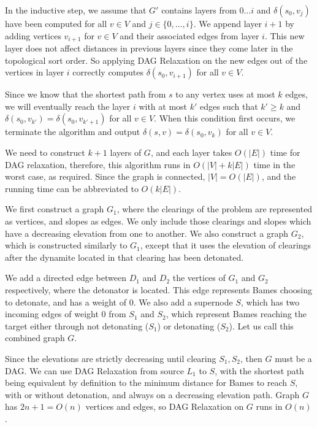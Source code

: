 \documentclass[12pt,twoside]{article}
\begin{document}
\begin{problems}
In the inductive step, we assume that $G'$ contains layers from $0 \ldots i$ and $\delta(s_0,v_j)$ have been computed for all $v \in V$ and $j \in \{0,\ldots,i\}$. We append layer $i+1$ by adding vertices $v_{i+1}$ for $v \in V$ and their associated edges from layer $i$. This new layer does not affect distances in previous layers since they come later in the topological sort order. So applying DAG Relaxation on the new edges out of the vertices in layer $i$ correctly computes $\delta(s_0,v_{i+1})$ for all $v \in V$.

Since we know that the shortest path from $s$ to any vertex uses at most $k$ edges, we will eventually reach the layer $i$ with at most $k'$ edges such that $k' \geq k$ and $\delta(s_0,v_{k'})=\delta(s_0,v_{k'+1})$ for all $v \in V$. When this condition first occurs, we terminate the algorithm and output $\delta(s,v)=\delta(s_0,v_k)$ for all $v \in V$.

We need to construct $k+1$ layers of $G$, and each layer takes $O(|E|)$ time for DAG relaxation, therefore, this algorithm runs in $O(|V|+k|E|)$ time in the worst case, as required. Since the graph is connected, $|V|=O(|E|)$, and the running time can be abbreviated to $O(k|E|)$.

\newpage
\problem  %
We first construct a graph $G_1$, where the clearings of the problem are represented as vertices, and slopes as edges. We only include those clearings and slopes which have a decreasing elevation from one to another. We also construct a graph $G_2$, which is constructed similarly to $G_1$, except that it uses the elevation of clearings after the dynamite located in that clearing has been detonated.

We add a directed edge between $D_1$ and $D_2$ the vertices of $G_1$ and $G_2$ respectively, where the detonator is located. This edge represents Bames choosing to detonate, and has a weight of 0. We also add a supernode $S$, which has two incoming edges of weight 0 from $S_1$ and $S_2$, which represent Bames reaching the target either through not detonating ($S_1$) or detonating ($S_2$). Let us call this combined graph $G$.

Since the elevations are strictly decreasing until clearing $S_1,S_2$, then $G$ must be a DAG. We can use DAG Relaxation from source $L_1$ to $S$, with the shortest path being equivalent by definition to the minimum distance for Bames to reach $S$, with or without detonation, and always on a decreasing elevation path. Graph $G$ has $2n+1=O(n)$ vertices and edges, so DAG Relaxation on $G$ runs in $O(n)$.


\end{problems}
\end{document}
